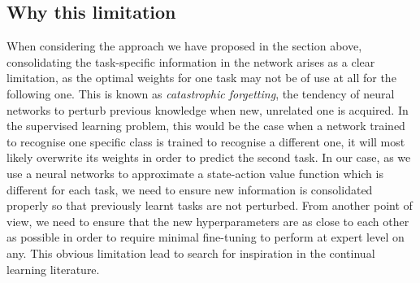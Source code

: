 \documentclass{article}
\begin{document}
\subsection{Why this limitation}
When considering the approach we have proposed in the section above, consolidating the task-specific information in the network arises as a clear limitation, as the optimal weights for one task may not be of use at all for the following one. This is known as \textit{catastrophic forgetting}, the tendency of neural networks to perturb previous knowledge when new, unrelated one is acquired. In the supervised learning problem, this would be the case when a network trained to recognise one specific class is trained to recognise a different one, it will most likely overwrite its weights in order to predict the second task. In our case, as we use a neural networks to approximate a state-action value function which is different for each task, we need to ensure new information is consolidated properly so that previously learnt tasks are not perturbed. From another point of view, we need to ensure that the new hyperparameters are as close to each other as possible in order to require minimal fine-tuning to perform at expert level on any. This obvious limitation lead to search for inspiration in the continual learning literature.
\end{document}

